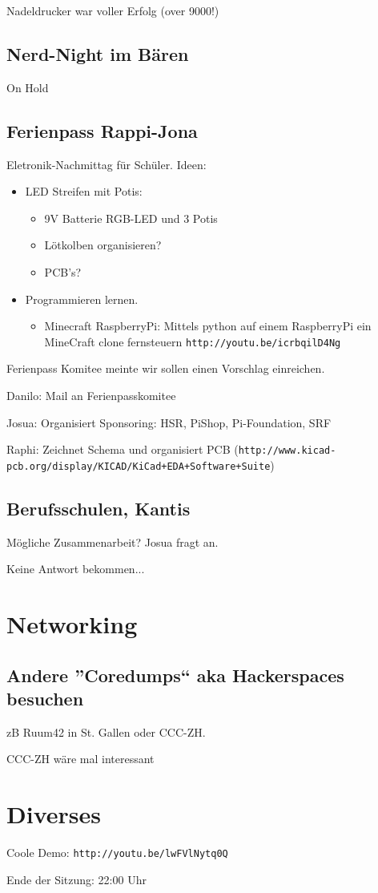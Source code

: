 \documentclass[10pt,a4paper,parskip,fleqn]{scrartcl}
\newcommand{\ul}{\begin{itemize}[itemsep=-0.3em,topsep=-0.3em]}
\newcommand{\lu}{\end{itemize}}
\newcommand{\li}{\item}
\begin{document}
Nadeldrucker war voller Erfolg (over 9000!)

\subsection{Nerd-Night im Bären}

On Hold

\subsection{Ferienpass Rappi-Jona}

Eletronik-Nachmittag für Schüler. Ideen:

\ul
	\li LED Streifen mit Potis:
	\ul
		\li 9V Batterie RGB-LED und 3 Potis
		\li Lötkolben organisieren?
		\li PCB's?
	\lu
	\li Programmieren lernen.
	\ul
		\li Minecraft RaspberryPi: Mittels python auf einem
		RaspberryPi ein MineCraft clone fernsteuern
		\texttt{http://youtu.be/icrbqilD4Ng}
	\lu
\lu

Ferienpass Komitee meinte wir sollen einen Vorschlag einreichen.

Danilo: Mail an Ferienpasskomitee 

Josua: Organisiert Sponsoring: HSR, PiShop, Pi-Foundation, SRF

Raphi: Zeichnet Schema und organisiert PCB (\texttt{http://www.kicad-pcb.org/display/KICAD/KiCad+EDA+Software+Suite})



\subsection{Berufsschulen, Kantis}

Mögliche Zusammenarbeit? Josua fragt an.

Keine Antwort bekommen...

\section{Networking}

\subsection{Andere ''Coredumps`` aka Hackerspaces besuchen}

zB Ruum42 in St. Gallen oder CCC-ZH.

CCC-ZH wäre mal interessant

\section{Diverses}

Coole Demo: \texttt{http://youtu.be/lwFVlNytq0Q}


\vspace{1cm}

Ende der Sitzung: 22:00 Uhr
\end{document}
